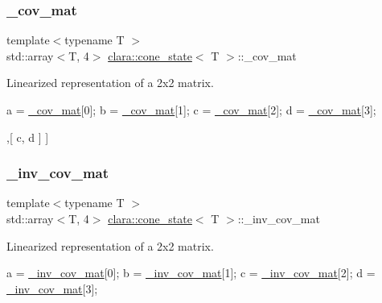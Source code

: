 \subsubsection{\texorpdfstring{\+\_\+cov\+\_\+mat}{\_cov\_mat}}
{\footnotesize\ttfamily template$<$typename T $>$ \\
std\+::array$<$T, 4$>$ \hyperlink{classclara_1_1cone__state}{clara\+::cone\+\_\+state}$<$ T $>$\+::\+\_\+cov\+\_\+mat\hspace{0.3cm}{\ttfamily [private]}}



Linearized representation of a 2x2 matrix. 


\begin{DoxyCode}
a = \hyperlink{classclara_1_1cone__state_a2a5e7dc2078a6d5ef80b1bac25354e2f}{\_cov\_mat}[0];
b = \hyperlink{classclara_1_1cone__state_a2a5e7dc2078a6d5ef80b1bac25354e2f}{\_cov\_mat}[1];
c = \hyperlink{classclara_1_1cone__state_a2a5e7dc2078a6d5ef80b1bac25354e2f}{\_cov\_mat}[2];
d = \hyperlink{classclara_1_1cone__state_a2a5e7dc2078a6d5ef80b1bac25354e2f}{\_cov\_mat}[3];
\end{DoxyCode}



\begin{DoxyCode}
[ [ a, b ]
 ,[ c, d ] ]
\end{DoxyCode}
 \mbox{\label{classclara_1_1cone__state_af36bb866c831dfc5b7b199d6434511f4}} 
\subsubsection{\texorpdfstring{\+\_\+inv\+\_\+cov\+\_\+mat}{\_inv\_cov\_mat}}
{\footnotesize\ttfamily template$<$typename T $>$ \\
std\+::array$<$T, 4$>$ \hyperlink{classclara_1_1cone__state}{clara\+::cone\+\_\+state}$<$ T $>$\+::\+\_\+inv\+\_\+cov\+\_\+mat\hspace{0.3cm}{\ttfamily [private]}}



Linearized representation of a 2x2 matrix. 


\begin{DoxyCode}
a = \hyperlink{classclara_1_1cone__state_af36bb866c831dfc5b7b199d6434511f4}{\_inv\_cov\_mat}[0];
b = \hyperlink{classclara_1_1cone__state_af36bb866c831dfc5b7b199d6434511f4}{\_inv\_cov\_mat}[1];
c = \hyperlink{classclara_1_1cone__state_af36bb866c831dfc5b7b199d6434511f4}{\_inv\_cov\_mat}[2];
d = \hyperlink{classclara_1_1cone__state_af36bb866c831dfc5b7b199d6434511f4}{\_inv\_cov\_mat}[3];
\end{DoxyCode}



